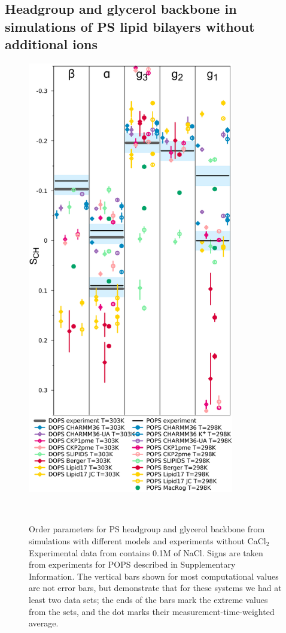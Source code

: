 \documentclass[aps,prl,superscriptaddress,twocolumn]{revtex4}
\begin{document}
\subsection{Headgroup and glycerol backbone in simulations of PS lipid bilayers without additional ions}
\begin{figure}[]
  \centering
  \includegraphics[width=9.0cm]{../Figs/HGorderparametersPS.pdf}
  \caption{\label{HGorderParametersPS}
    Order parameters for PS headgroup and glycerol
    backbone from simulations with different models and experiments without CaCl$_2$ 
    Experimental data from \cite{browning80} contains 0.1M of NaCl.
    Signs are taken from experiments for POPS described in Supplementary Information.
    The vertical bars shown for most computational values are not error bars, but demonstrate that for these systems we had at least two data sets; the ends of the bars mark the extreme values from the sets, and the dot marks their measurement-time-weighted average.
  }
   \\
\end{figure}
\end{document}
